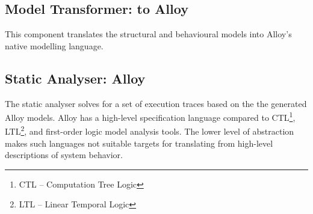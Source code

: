 \subsection{Model Transformer: to Alloy}
\label{sec:framework-overview-model-transformer}
This component translates the structural and behavioural models into Alloy's native modelling language.


\subsection{Static Analyser: Alloy}
\label{sec:framework-overview-static-analyser}
The static analyser solves for a set of execution traces based on the the generated Alloy models. Alloy has a high-level specification language compared to CTL\footnote{CTL – Computation Tree Logic}, LTL\footnote{LTL – Linear Temporal Logic}, and first-order logic model analysis tools. The lower level of abstraction makes such languages not suitable targets for translating from high-level descriptions of system behavior.

